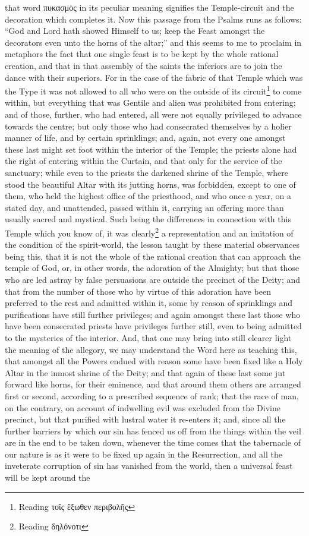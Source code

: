 that word \textgreek{πυκασμὸς} in its peculiar meaning signifies the Temple-circuit and the decoration which completes it. Now this passage from the Psalms runs as follows: “God and Lord hath showed Himself to us; keep the Feast amongst the decorators even unto the horns of the altar;” and this seems to me to proclaim in metaphors the fact that one single feast is to be kept by the whole rational creation, and that in that assembly of the saints the inferiors are to join the dance with their superiors. For in the case of the fabric of that Temple which was the Type it was not allowed to all who were on the outside of its circuit\footnote{Reading \textgreek{τοῖς ἔξωθεν περιβολῆς}} to come within, but everything that was Gentile and alien was prohibited from entering; and of those, further, who had entered, all were not equally privileged to advance towards the centre; but only those who had consecrated themselves by a holier manner of life, and by certain sprinklings; and, again, not every one amongst these last might set foot within the interior of the Temple; the priests alone had the right of entering within the Curtain, and that only for the service of the sanctuary; while even to the priests the darkened shrine of the Temple, where stood the beautiful Altar with its jutting horns, was forbidden, except to one of them, who held the highest office of the priesthood, and who once a year, on a stated day, and unattended, passed within it, carrying an offering more than usually sacred and mystical. Such being the differences in connection with this Temple which you know of, it was clearly\footnote{Reading \textgreek{δηλόνοτι}} a representation and an imitation of the condition of the spirit-world, the lesson taught by these material observances being this, that it is not the whole of the rational creation that can approach the temple of God, or, in other words, the adoration of the Almighty; but that those who are led astray by false persuasions are outside the precinct of the Deity; and that from the number of those who by virtue of this adoration have been preferred to the rest and admitted within it, some by reason of sprinklings and purifications have still further privileges; and again amongst these last those who have been consecrated priests have privileges further still, even to being admitted to the mysteries of the interior. And, that one may bring into still clearer light the meaning of the allegory, we may understand the Word here as teaching this, that amongst all the Powers endued with reason some have been fixed like a Holy Altar in the inmost shrine of the Deity; and that again of these last some jut forward like horns, for their eminence, and that around them others are arranged first or second, according to a prescribed sequence of rank; that the race of man, on the contrary, on account of indwelling evil was excluded from the Divine precinct, but that purified with lustral water it re-enters it; and, since all the further barriers by which our sin has fenced us off from the things within the veil are in the end to be taken down, whenever the time comes that the tabernacle of our nature is as it were to be fixed up again in the Resurrection, and all the inveterate corruption of sin has vanished from the world, then a universal feast will be kept around the 